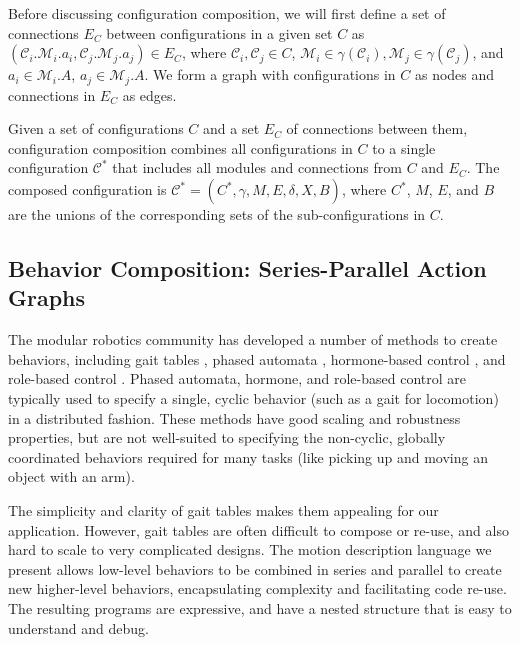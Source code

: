 \documentclass[graybox]{svmult}
\begin{document}
Before discussing configuration composition, we will first define a set of connections $E_C$ between configurations in a given set $C$ as $(\mathcal{C}_i.\mathcal{M}_i.a_i, \mathcal{C}_j.\mathcal{M}_j.a_j) \in E_C$, where $\mathcal{C}_{i},\mathcal{C}_j\in C$, $\mathcal{M}_i \in \gamma(\mathcal{C}_i), \mathcal{M}_j \in \gamma(\mathcal{C}_j)$, and $a_i\in \mathcal{M}_i.A$, $a_j\in \mathcal{M}_j.A$. We form a
 graph with configurations in $C$ as nodes and connections in $E_C$ as edges.

Given a set of configurations $C$ and a set $E_C$ of connections between them,
configuration composition combines all configurations in $C$ to a single
configuration $\mathcal{C}^*$ that includes all modules and connections from $C$
and $E_C$. The composed configuration is $\mathcal{C}^*=(C^*, \gamma, M, E, \delta,
X, B)$, where \(C^*\), \(M\), \(E\), and \(B\) are  the unions of the
corresponding sets of the sub-configurations in \(C\).

\subsection{Behavior Composition: Series-Parallel Action Graphs}
\label{sec:behavior-representation}
The modular robotics community has developed a number of methods
to create behaviors, including gait tables \cite{yim1994locomotion}, phased automata
\cite{zhang2003phase}, hormone-based control \cite{salemi2001hormone},
and role-based control \cite{stoy2002using}. Phased automata, hormone, and role-based
control are typically used to specify a single, cyclic behavior (such as a gait for
locomotion) in a distributed fashion.
These methods have good scaling and robustness properties, but are not well-suited
to specifying  the non-cyclic, globally coordinated behaviors required for many tasks
(like picking up and moving an object with an arm).
  
The simplicity and clarity of gait tables makes them appealing for our
application.  However, gait tables are often difficult to compose or re-use, and also hard to
scale to very complicated designs. The  motion description language we present
allows low-level behaviors to be combined in series and parallel to create new
higher-level behaviors, encapsulating complexity and facilitating code re-use.
The resulting programs are expressive, and have a nested structure
that is easy to understand and debug.
\end{document}
